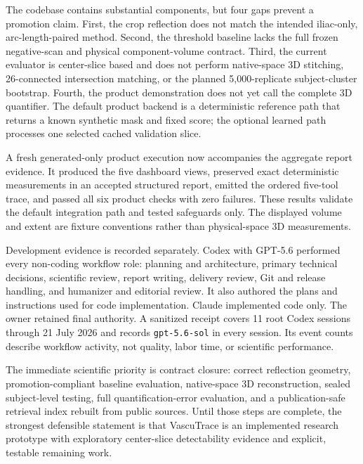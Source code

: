 \documentclass[11pt]{article}
\begin{document}
The codebase contains substantial components, but four gaps prevent a promotion claim. First, the crop reflection does not match the intended iliac-only, arc-length-paired method. Second, the threshold baseline lacks the full frozen negative-scan and physical component-volume contract. Third, the current evaluator is center-slice based and does not perform native-space 3D stitching, 26-connected intersection matching, or the planned 5,000-replicate subject-cluster bootstrap. Fourth, the product demonstration does not yet call the complete 3D quantifier. The default product backend is a deterministic reference path that returns a known synthetic mask and fixed score; the optional learned path processes one selected cached validation slice.

A fresh generated-only product execution now accompanies the aggregate report evidence. It produced the five dashboard views, preserved exact deterministic measurements in an accepted structured report, emitted the ordered five-tool trace, and passed all six product checks with zero failures. These results validate the default integration path and tested safeguards only. The displayed volume and extent are fixture conventions rather than physical-space 3D measurements.

Development evidence is recorded separately. Codex with GPT-5.6 performed every non-coding workflow role: planning and architecture, primary technical decisions, scientific review, report writing, delivery review, Git and release handling, and humanizer and editorial review. It also authored the plans and instructions used for code implementation. Claude implemented code only. The owner retained final authority. A sanitized receipt covers 11 root Codex sessions through 21 July 2026 and records \texttt{gpt-5.6-sol} in every session. Its event counts describe workflow activity, not quality, labor time, or scientific performance.

The immediate scientific priority is contract closure: correct reflection geometry, promotion-compliant baseline evaluation, native-space 3D reconstruction, sealed subject-level testing, full quantification-error evaluation, and a publication-safe retrieval index rebuilt from public sources. Until those steps are complete, the strongest defensible statement is that VascuTrace is an implemented research prototype with exploratory center-slice detectability evidence and explicit, testable remaining work.

\clearpage
{}
\end{document}
